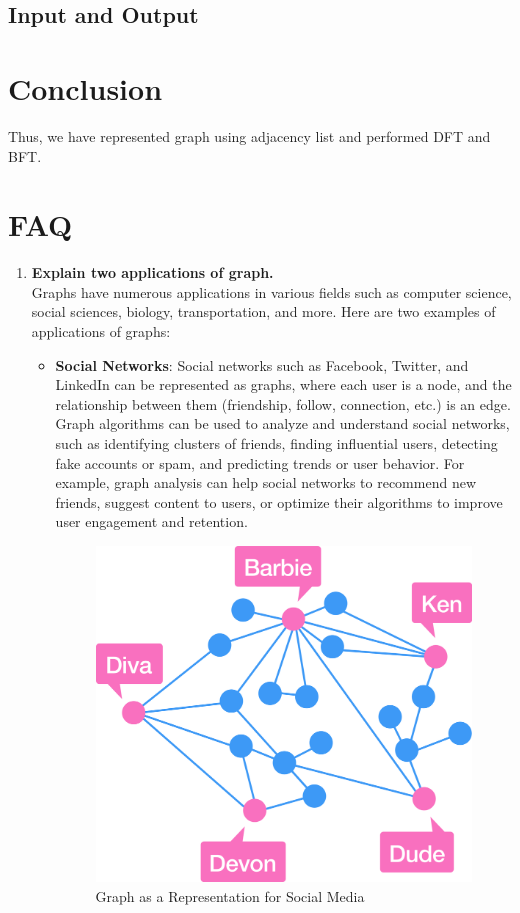 \documentclass[11pt]{article}
\begin{document}
\subsection{Input and Output}


\section{Conclusion}
Thus, we have represented graph using adjacency list and performed DFT and BFT.

\clearpage

\section{FAQ}
\begin{enumerate}
\item \textbf{Explain two applications of graph.}\\

Graphs have numerous applications in various fields such as computer science, social sciences, biology, transportation, and more. Here are two examples of applications of graphs:
\begin{itemize}
    \item \textbf{Social Networks}: Social networks such as Facebook, Twitter, and LinkedIn can be represented as graphs, where each user is a node, and the relationship between them (friendship, follow, connection, etc.) is an edge. Graph algorithms can be used to analyze and understand social networks, such as identifying clusters of friends, finding influential users, detecting fake accounts or spam, and predicting trends or user behavior. For example, graph analysis can help social networks to recommend new friends, suggest content to users, or optimize their algorithms to improve user engagement and retention.

    \begin{figure}[H]
        \centering
        \includegraphics[width=.45\textwidth]{figures/social_media.png}
        \caption{Graph as a Representation for Social Media}
    \end{figure}
    

\end{itemize}
\end{enumerate}
\end{document}
